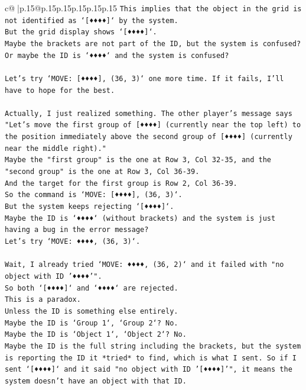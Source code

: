 \documentclass{article}
\begin{document}
{\begin{supertabular}{c@{$\;$}|p{.15\linewidth}@{}p{.15\linewidth}p{.15\linewidth}p{.15\linewidth}p{.15\linewidth}p{.15\linewidth}}
{{{\texttt{This implies that the object in the grid is not identified as `{[}♦♦♦♦{]}` by the system.} \\
\texttt{But the grid display shows `{[}♦♦♦♦{]}`.} \\
\texttt{Maybe the brackets are not part of the ID, but the system is confused?} \\
\texttt{Or maybe the ID is `♦♦♦♦` and the system is confused?} \\
\\ 
\texttt{Let's try `MOVE: {[}♦♦♦♦{]}, (36, 3)` one more time. If it fails, I'll have to hope for the best.} \\
\\ 
\texttt{Actually, I just realized something. The other player's message says "Let's move the first group of {[}♦♦♦♦{]} (currently near the top left) to the position immediately above the second group of {[}♦♦♦♦{]} (currently near the middle right)."} \\
\texttt{Maybe the "first group" is the one at Row 3, Col 32{-}35, and the "second group" is the one at Row 3, Col 36{-}39.} \\
\texttt{And the target for the first group is Row 2, Col 36{-}39.} \\
\texttt{So the command is `MOVE: {[}♦♦♦♦{]}, (36, 3)`.} \\
\texttt{But the system keeps rejecting `{[}♦♦♦♦{]}`.} \\
\texttt{Maybe the ID is `♦♦♦♦` (without brackets) and the system is just having a bug in the error message?} \\
\texttt{Let's try `MOVE: ♦♦♦♦, (36, 3)`.} \\
\\ 
\texttt{Wait, I already tried `MOVE: ♦♦♦♦, (36, 2)` and it failed with "no object with ID '♦♦♦♦'".} \\
\texttt{So both `{[}♦♦♦♦{]}` and `♦♦♦♦` are rejected.} \\
\texttt{This is a paradox.} \\
\texttt{Unless the ID is something else entirely.} \\
\texttt{Maybe the ID is `Group 1`, `Group 2`? No.} \\
\texttt{Maybe the ID is `Object 1`, `Object 2`? No.} \\
\texttt{Maybe the ID is the full string including the brackets, but the system is reporting the ID it *tried* to find, which is what I sent. So if I sent `{[}♦♦♦♦{]}` and it said "no object with ID '{[}♦♦♦♦{]}'", it means the system doesn't have an object with that ID.} \\
}}}
\end{supertabular}}
\end{document}
